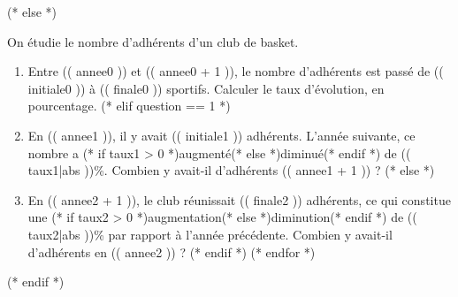 (* else *)

    On étudie le nombre d'adhérents d'un club de basket.

    \begin{enumerate}
      (* for question in ordre *)
        (* if question == 0 *)
          \item
            Entre (( annee0 )) et (( annee0 + 1 )),
            le nombre d'adhérents est passé de (( initiale0 )) à (( finale0 )) sportifs.
            Calculer le taux d'évolution, en pourcentage.
        (* elif question == 1 *)
          \item
              En (( annee1 )), il y avait (( initiale1 )) adhérents.
              L'année suivante, ce nombre a (* if taux1 > 0 *)augmenté(* else *)diminué(* endif *) de (( taux1|abs ))\%.
              Combien y avait-il d'adhérents (( annee1 + 1 )) ?
        (* else *)
          \item
              En (( annee2 + 1 )), le club réunissait (( finale2 )) adhérents,
            ce qui constitue une (* if taux2 > 0 *)augmentation(* else *)diminution(* endif *) de (( taux2|abs ))\% par rapport à l'année précédente.
            Combien y avait-il d'adhérents en (( annee2 )) ?
        (* endif *)
      (* endfor *)
    \end{enumerate}

(* endif *)

